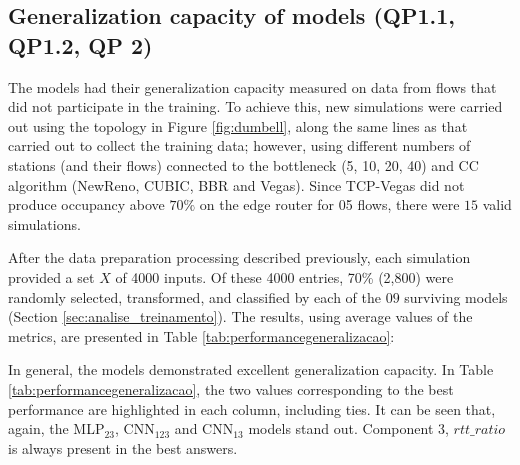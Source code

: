 \documentclass[a4paper,fleqn]{cas-sc}
\begin{document}
\subsection{Generalization capacity of models (QP1.1, QP1.2, QP 2)}
The models had their generalization capacity measured on data from flows that did not participate in the training. \text To achieve this, new simulations were carried out using the topology in Figure \ref{fig:dumbell}, along the same lines as that carried out to collect the training data; however, using different numbers of stations (and their flows) connected to the bottleneck (5, 10, 20, 40) and  CC algorithm (NewReno, CUBIC, BBR and Vegas). Since TCP-Vegas did not produce occupancy above $70\%$ on the edge router for 05 flows, there were $15$ valid simulations.

After the data preparation processing described previously, each simulation provided a set $X$ of 4000 inputs. Of these 4000 entries, 70\% (2,800) were randomly selected, transformed, and classified by each of the $09$ surviving models (Section \ref{sec:analise_treinamento}). The results, using average values of the metrics, are presented in Table \ref{tab:performancegeneralizacao}:

In general, the models demonstrated excellent generalization capacity. In Table \ref{tab:performancegeneralizacao}, the two values corresponding to the best performance are highlighted in each column, including ties. It can be seen that, again, the MLP$_{23}$, CNN$_{123}$ and CNN$_{13}$ models stand out. Component 3, $rtt\_ratio$ is always present in the best answers.
\end{document}
